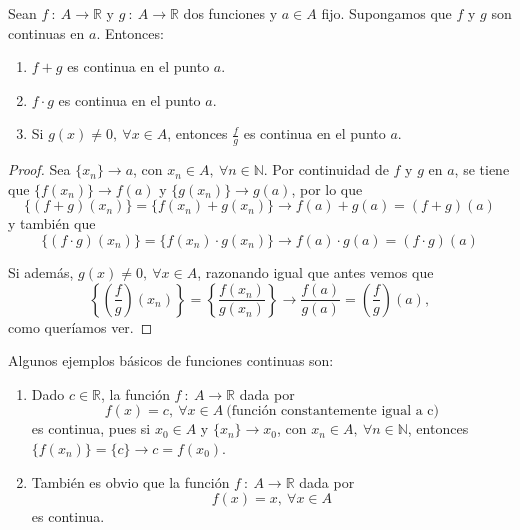 \begin{prop}\label{prop:12.2.3}
    Sean $f ~:~ A \longrightarrow \mathbb{R}$ y $g ~:~ A \longrightarrow \mathbb{R}$ dos funciones y $a \in A$ fijo.
    Supongamos que $f$ y $g$ son continuas en $a$. Entonces:
    \begin{enumerate}
        \item $f+g$ es continua en el punto $a$.
        \item $f \cdot g$ es continua en el punto $a$.
        \item Si $g(x) \neq 0, ~ \forall x \in A$, entonces $\frac{f}{g}$ es continua en el punto $a$.
    \end{enumerate}
\end{prop}
\begin{proof}
    Sea $\{x_n\} \longrightarrow a$, con $x_n \in A, ~ \forall n \in \mathbb{N}$. Por continuidad de $f$ y $g$ en $a$,
    se tiene que $\{f(x_n)\} \longrightarrow f(a)$ y $\{g(x_n)\} \longrightarrow g(a)$, por lo que
    \begin{equation*}
        \{(f+g)(x_n)\} = \{f(x_n)+g(x_n)\} \longrightarrow f(a) + g(a) = (f+g)(a)
    \end{equation*}
    y también que
    \begin{equation*}
        \{(f \cdot g)(x_n)\} = \{f(x_n) \cdot g(x_n)\} \longrightarrow f(a) \cdot g(a) = (f \cdot g)(a)
    \end{equation*}
    
    Si además, $g(x) \neq 0, ~ \forall x \in A$, razonando igual que antes vemos que
    \begin{equation*}
        \left\{ \left(\frac{f}{g}\right)(x_n) \right\} = \left\{ \frac{f(x_n)}{g(x_n)} \right\} \longrightarrow \frac{f(a)}{g(a)} = \left(\frac{f}{g}\right)(a),
    \end{equation*}
    como queríamos ver.
\end{proof}

\begin{ejemplo} Algunos ejemplos básicos de funciones continuas son:
\begin{enumerate}
    \item Dado $c \in \mathbb{R}$, la función $f ~:~ A \longrightarrow \mathbb{R}$ dada por
    \begin{equation*}
        f(x) = c, ~ \forall x \in A ~ \text{(función constantemente igual a c)}
    \end{equation*}
    es continua, pues si $x_0 \in A$ y $\{x_n\} \longrightarrow x_0$, con $x_n \in A, ~ \forall n \in \mathbb{N}$,
    entonces $\{f(x_n)\} = \{c\} \longrightarrow c = f(x_0)$.

    \item También es obvio que la función $f ~:~ A \longrightarrow \mathbb{R}$ dada por
    \begin{equation*}
        f(x) = x, ~ \forall x \in A
    \end{equation*}
    es continua.
\end{enumerate}
\end{ejemplo}

